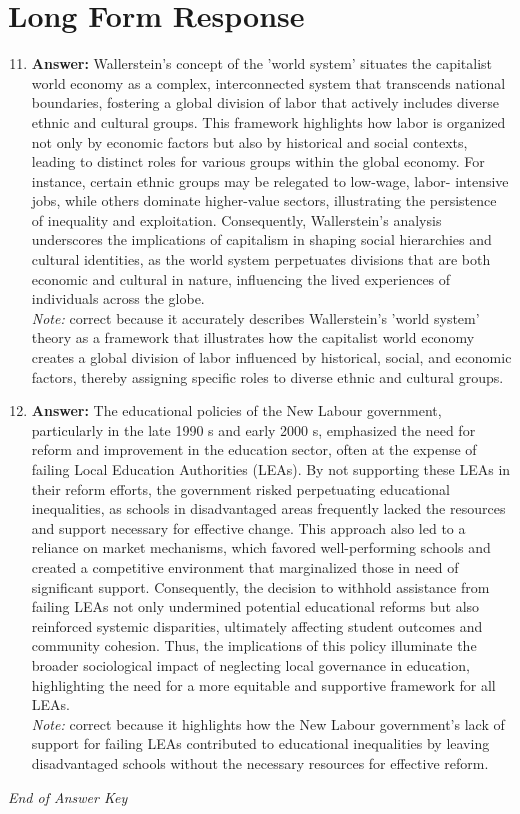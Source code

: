 \documentclass[12pt]{article}
\begin{document}
\section*{Long Form Response}
\begin{enumerate}[label=\arabic*.]
\setcounter{enumi}{10}
\item \textbf{Answer:} Wallerstein's concept of the 'world system' situates the capitalist world economy as a complex, interconnected system that transcends national boundaries, fostering a global division of labor that actively includes diverse ethnic and cultural groups. This framework highlights how labor is organized not only by economic factors but also by historical and social contexts, leading to distinct roles for various groups within the global economy. For instance, certain ethnic groups may be relegated to low-wage, labor- intensive jobs, while others dominate higher-value sectors, illustrating the persistence of inequality and exploitation. Consequently, Wallerstein's analysis underscores the implications of capitalism in shaping social hierarchies and cultural identities, as the world system perpetuates divisions that are both economic and cultural in nature, influencing the lived experiences of individuals across the globe.
\\ \textit{Note:} correct because it accurately describes Wallerstein's 'world system' theory as a framework that illustrates how the capitalist world economy creates a global division of labor influenced by historical, social, and economic factors, thereby assigning specific roles to diverse ethnic and cultural groups.
\item \textbf{Answer:} The educational policies of the New Labour government, particularly in the late 1990 s and early 2000 s, emphasized the need for reform and improvement in the education sector, often at the expense of failing Local Education Authorities (LEAs). By not supporting these LEAs in their reform efforts, the government risked perpetuating educational inequalities, as schools in disadvantaged areas frequently lacked the resources and support necessary for effective change. This approach also led to a reliance on market mechanisms, which favored well-performing schools and created a competitive environment that marginalized those in need of significant support. Consequently, the decision to withhold assistance from failing LEAs not only undermined potential educational reforms but also reinforced systemic disparities, ultimately affecting student outcomes and community cohesion. Thus, the implications of this policy illuminate the broader sociological impact of neglecting local governance in education, highlighting the need for a more equitable and supportive framework for all LEAs.
\\ \textit{Note:} correct because it highlights how the New Labour government's lack of support for failing LEAs contributed to educational inequalities by leaving disadvantaged schools without the necessary resources for effective reform.
\end{enumerate}

\vfill
\noindent\textit{End of Answer Key}
\end{document}
